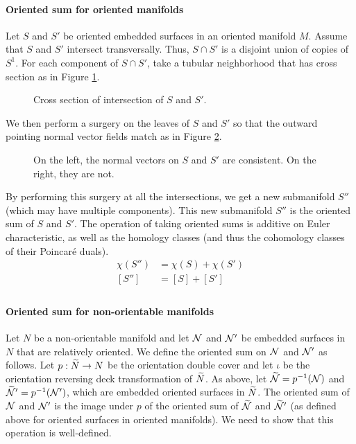 \paragraph{Oriented sum for oriented manifolds}

Let $S$ and $S'$ be oriented embedded surfaces in an oriented manifold $M$.
Assume that $S$ and $S'$ intersect transversally.
Thus, $S \cap S'$ is a disjoint union of copies of $S^1$.
For each component of $S\cap S'$, take a tubular neighborhood that has cross section as in Figure \ref{fig:cross-section}.

\begin{figure}
  \centering
  \caption{Cross section of intersection of $S$ and $S'$.}
  \label{fig:cross-section}
\end{figure}

We then perform a surgery on the leaves of $S$ and $S'$ so that the outward pointing normal vector fields match as in Figure \ref{fig:surgery}.
\begin{figure}
  \centering
  \caption{On the left, the normal vectors on $S$ and $S'$ are consistent. On the right, they are not.}
  \label{fig:surgery}
\end{figure}

By performing this surgery at all the intersections, we get a new submanifold $S''$ (which may have multiple components).
This new submanifold $S''$ is the oriented sum of $S$ and $S'$.
The operation of taking oriented sums is additive on Euler characteristic, as well as the homology classes (and thus the cohomology classes of their Poincar\'e duals).
\begin{align*}
  \chi(S'') &= \chi(S) + \chi(S') \\
  [S''] &= [S] + [S'] \\
\end{align*}

\paragraph{Oriented sum for non-orientable manifolds}

Let $N$ be a non-orientable manifold and let $\mathcal{N}$ and $\mathcal{N}'$ be embedded surfaces in $N$ that are relatively oriented.
We define the oriented sum on $\mathcal{N}$ and $\mathcal{N}'$ as follows.
Let $p:\widetilde{N}\rightarrow N$ be the orientation double cover and let $\iota$ be the orientation reversing deck transformation of $\widetilde{N}$.
As above, let $\widetilde{\mathcal{N}}=p^{-1}(\mathcal{N})$ and $\widetilde{\mathcal{N}}'=p^{-1}(\mathcal{N}')$, which are embedded oriented surfaces in $\widetilde{N}$.
The oriented sum of $\mathcal{N}$ and $\mathcal{N}'$ is the image under $p$ of the oriented sum of $\widetilde{\mathcal{N}}$ and $\widetilde{\mathcal{N}}'$ (as defined above for oriented surfaces in oriented manifolds).
We need to show that this operation is well-defined.

